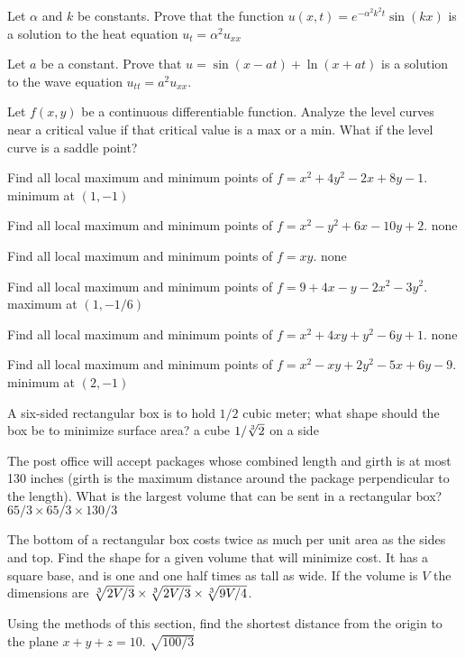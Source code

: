 \begin{multicols}{2}
\problem Let $\alpha$ and $k$ be constants.  Prove that the function %
$u(x,t)=e^{-\alpha^2k^2t}\sin(kx)$ is a solution to the heat equation
$u_t=\alpha^2u_{xx}$

\problem Let $a$ be a constant.  Prove that $u=\sin(x-at)+\ln(x+at)$ is a %
solution to the wave equation $u_{tt}=a^2u_{xx}$.

\problem Let $f(x,y)$ be a continuous differentiable function.  Analyze the %
level curves near a critical value if that critical value is a max or a
min.  What if the level curve is a saddle point?





\problem Find all local maximum and minimum points of $f=x^2+4y^2-2x+8y-1$. %
\answer minimum at $(1,-1)$
\endanswer

\problem Find all local maximum and minimum points of $f=x^2-y^2+6x-10y+2$. %
\answer none
\endanswer

\problem Find all local maximum and minimum points of $f=xy$.  \answer none %
\endanswer

\problem Find all local maximum and minimum points of $f=9+4x-y-2x^2-3y^2$. %
\answer maximum at $(1,-1/6)$
\endanswer

\problem Find all local maximum and minimum points of $f=x^2+4xy+y^2-6y+1$. %
\answer none
\endanswer

\problem Find all local maximum and minimum points of %
$f=x^2-xy+2y^2-5x+6y-9$.  \answer minimum at $(2,-1)$
\endanswer

\problem A six-sided rectangular box is to hold $1/2$ cubic meter; what %
shape should the box be to minimize surface area?  \answer a cube $1/\root
3 \of {2}$ on a side
\endanswer

\problem The post office will accept packages whose combined length and %
girth is at most 130 inches (girth is the maximum distance around the
package perpendicular to the length). What is the largest volume that can
be sent in a rectangular box?  \answer $65/3\times 65/3\times 130/3$
\endanswer

\problem The bottom of a rectangular box costs twice as much per unit area %
as the sides and top. Find the shape for a given volume that will minimize
cost.  \answer It has a square base, and is one and one half times as tall
as wide.  If the volume is $V$ the dimensions are $\root 3 \of {2V/3}\times
\root 3 \of {2V/3}\times \root 3\of {9V/4}$.
\endanswer

\problem Using the methods of this section, find the shortest distance from %
the origin to the plane $x+y+z=10$.  \answer $\sqrt{100/3}$
\endanswer


\end{multicols}

